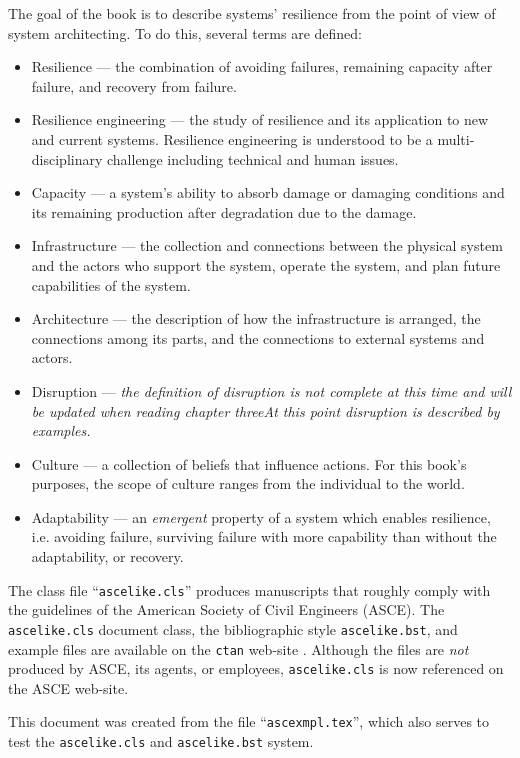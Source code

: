 \documentclass[Proceedings]{ascelike}
\begin{document}
The goal of the book is to describe systems' resilience from the point of view of
system architecting. To do this, several terms are defined:
\begin{itemize}
\item
Resilience --- the combination of avoiding failures, remaining capacity
after failure, and recovery from failure.
\item
Resilience engineering --- the study of resilience and its application
to new and current systems. Resilience engineering is understood to be
a multi-disciplinary challenge including technical and human issues.
\item
Capacity --- a system's ability to absorb damage or damaging
conditions and its remaining production after degradation due to the damage.
\item
Infrastructure --- the collection and connections between the physical
system and the actors who support the system, operate the system, and
plan future capabilities of the system.
\item
Architecture --- the description of how the infrastructure is
arranged, the connections among its parts, and the connections to
external systems and actors.
\item
Disruption --- \emph{the definition of disruption is not complete at
  this time and will be updated when reading chapter threeAt this
point disruption is described by examples. } 
\item
Culture --- a collection of beliefs that influence actions. For this
book's purposes, the scope of culture ranges from the individual to
the world.
\item
Adaptability --- an \emph{emergent} property of a system which enables
resilience, i.e. avoiding failure, surviving failure with more
capability than without the adaptability, or recovery. \cite{ScottJack}
\end{itemize}
The class file ``\texttt{ascelike.cls}''
produces manuscripts that roughly comply with the
guidelines of the American Society of Civil Engineers (ASCE).
The \texttt{ascelike.cls} document class, the 
bibliographic style \texttt{ascelike.bst}, and
example files are available on the \texttt{ctan}
web-site \cite{Kuhn:2011a}.
Although the files are \emph{not} produced by ASCE, its agents,
or employees, \texttt{ascelike.cls} is now referenced on
the ASCE web-site.
\par
This document was created from the file
``\texttt{ascexmpl.tex}'', which also serves to test the 
\texttt{ascelike.cls} and \texttt{ascelike.bst} system.
\end{document}
